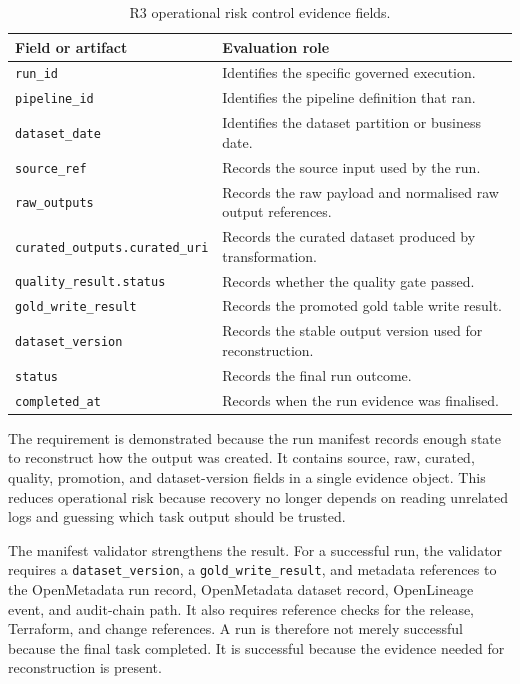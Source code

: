 \begin{table}[H]
  \centering
  \caption{R3 operational risk control evidence fields.}
  \label{tab:evaluation-r3-fields}
  \renewcommand{\arraystretch}{1.15}
  \begin{tabularx}{\textwidth}{@{}p{}X@{}}
    \toprule
    \textbf{Field or artifact} & \textbf{Evaluation role} \\
    \midrule
    \texttt{run\_id} & Identifies the specific governed execution. \\
    \texttt{pipeline\_id} & Identifies the pipeline definition that ran. \\
    \texttt{dataset\_date} & Identifies the dataset partition or business date. \\
    \texttt{source\_ref} & Records the source input used by the run. \\
    \texttt{raw\_outputs} & Records the raw payload and normalised raw output references. \\
    \texttt{curated\_outputs.curated\_uri} & Records the curated dataset produced by transformation. \\
    \texttt{quality\_result.status} & Records whether the quality gate passed. \\
    \texttt{gold\_write\_result} & Records the promoted gold table write result. \\
    \texttt{dataset\_version} & Records the stable output version used for reconstruction. \\
    \texttt{status} & Records the final run outcome. \\
    \texttt{completed\_at} & Records when the run evidence was finalised. \\
    \bottomrule
  \end{tabularx}
\end{table}

The requirement is demonstrated because the run manifest records enough state
to reconstruct how the output was created. It contains source, raw, curated,
quality, promotion, and dataset-version fields in a single evidence object.
This reduces operational risk because recovery no longer depends on reading
unrelated logs and guessing which task output should be trusted.

The manifest validator strengthens the result. For a successful run, the
validator requires a \texttt{dataset\_version}, a \texttt{gold\_write\_result},
and metadata references to the OpenMetadata run record, OpenMetadata dataset
record, OpenLineage event, and audit-chain path. It also requires reference
checks for the release, Terraform, and change references. A run is therefore
not merely successful because the final task completed. It is successful
because the evidence needed for reconstruction is present.

